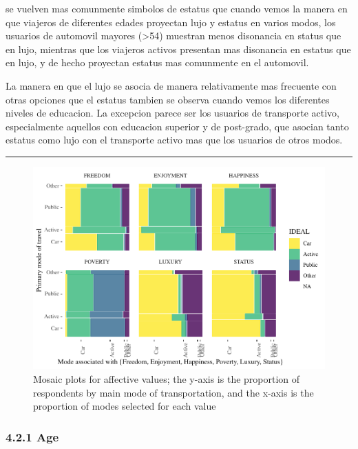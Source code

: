 \documentclass[]{elsarticle} %
\makeatletter
\def\maxwidth{\ifdim\Gin@nat@width>\linewidth\linewidth
\else\Gin@nat@width\fi}
\let\Oldincludegraphics\includegraphics
\renewcommand{\includegraphics}[1]{\Oldincludegraphics[width=\maxwidth]{#1}}
\makeatother
\begin{document}
se vuelven mas comunmente simbolos de estatus que cuando vemos la manera
en que viajeros de diferentes edades proyectan lujo y estatus en varios
modos, los usuarios de automovil mayores (\textgreater{}54) muestran
menos disonancia en status que en lujo, mientras que los viajeros
activos presentan mas disonancia en estatus que en lujo, y de hecho
proyectan estatus mas comunmente en el automovil.

La manera en que el lujo se asocia de manera relativamente mas frecuente
con otras opciones que el estatus tambien se observa cuando vemos los
diferentes niveles de educacion. La excepcion parece ser los usuarios de
transporte activo, especialmente aquellos con educacion superior y de
post-grado, que asocian tanto estatus como lujo con el transporte activo
mas que los usuarios de otros modos.

\begin{center}\rule{0.5\linewidth}{\linethickness}\end{center}

\begin{figure}
\centering
\includegraphics{Dissonance_Santiago_v1_files/figure-latex/figure-mosaic-plots-by-attribute-1.pdf}
\caption{\label{fig:mosaic-plots-by-attribute}Mosaic plots for affective
values; the y-axis is the proportion of respondents by main mode of
transportation, and the x-axis is the proportion of modes selected for
each value}
\end{figure}

\hypertarget{age-1}{%
\subsubsection{4.2.1 Age}\label{age-1}}
\end{document}
